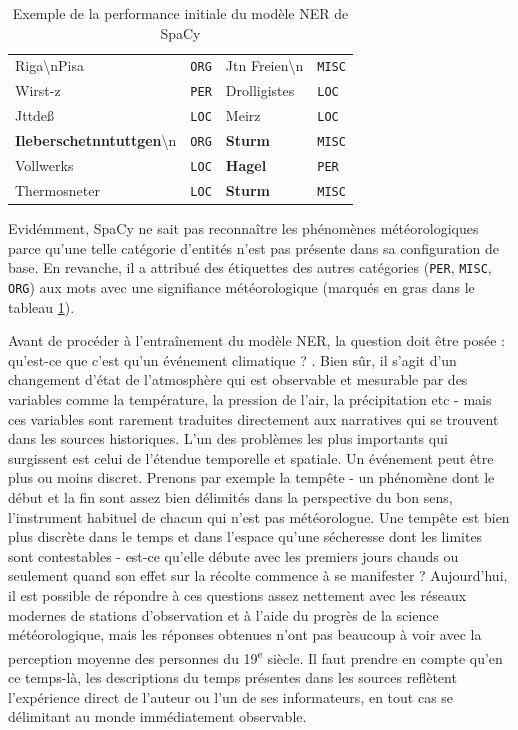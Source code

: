 \documentclass[a4paper,twoside,12pt]{article}
\begin{document}
\begin{table}[!h]
    \centering
    \begin{tabular}{|l|l|l|l|}
    \hline
        Riga\textbackslash nPisa & \texttt{ORG} & Jtn Freien\textbackslash n & \texttt{MISC}  \\
        Wirst-z & \texttt{PER} & Drolligistes & \texttt{LOC} \\
        Jttdeß & \texttt{LOC} & Meirz & \texttt{LOC} \\
        \textbf{Ileberschetnntuttgen}\textbackslash n & \texttt{ORG} & \textbf{Sturm} & \texttt{MISC} \\
        Vollwerks & \texttt{LOC} & \textbf{Hagel} & \texttt{PER} \\
        Thermosneter & \texttt{LOC} & \textbf{Sturm} & \texttt{MISC} \\
    \hline
    \end{tabular}
    \caption{Exemple de la performance initiale du modèle NER de SpaCy}
    \label{tab:first_ner_example}
\end{table}

Evidémment, SpaCy ne sait pas reconnaître les phénomènes météorologiques parce qu'une telle catégorie d'entités n'est pas présente dans sa configuration de base. En revanche, il a attribué des étiquettes des autres catégories (\texttt{PER}, \texttt{MISC}, \texttt{ORG}) aux mots avec une signifiance météorologique (marqués en gras dans le tableau \ref{tab:first_ner_example}).

Avant de procéder à l'entraînement du modèle NER, la question doit être posée : \og qu'est-ce que c'est qu'un événement climatique ? \fg{}. Bien sûr, il s'agit d'un changement d'état de l'atmosphère qui est observable et mesurable par des variables comme la température, la pression de l'air, la précipitation etc - mais ces variables sont rarement traduites directement aux narratives qui se trouvent dans les sources historiques. L'un des problèmes les plus importants qui surgissent est celui de l'étendue temporelle et spatiale. Un \og événement \fg{} peut être plus ou moins discret. Prenons par exemple la tempête - un phénomène dont le début et la fin sont assez bien délimités dans la perspective du bon sens, l'instrument habituel de chacun qui n'est pas météorologue. Une tempête est bien plus discrète dans le temps et dans l'espace qu'une sécheresse dont les limites sont contestables - est-ce qu'elle débute avec les premiers jours chauds ou seulement quand son effet sur la récolte commence à se manifester ? Aujourd'hui, il est possible de répondre à ces questions assez nettement avec les réseaux modernes de stations d'observation et à l'aide du progrès de la science météorologique, mais les réponses obtenues n'ont pas beaucoup à voir avec la perception moyenne des personnes du 19\textsuperscript{e} siècle. Il faut prendre en compte qu'en ce temps-là, les descriptions du temps présentes dans les sources reflètent l'expérience direct de l'auteur ou l'un de ses informateurs, en tout cas se délimitant au monde immédiatement observable.
\end{document}
